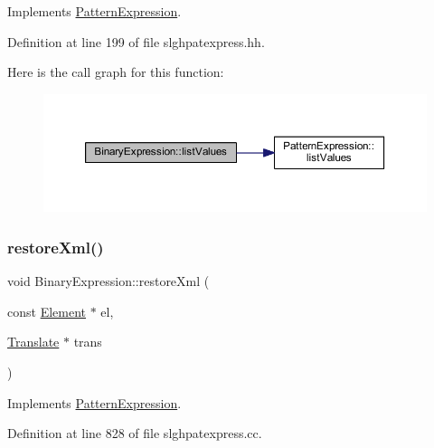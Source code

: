 Implements \mbox{\hyperlink{class_pattern_expression_a48d1a8fce687ba5c272b2e0d72760363}{Pattern\+Expression}}.



Definition at line 199 of file slghpatexpress.\+hh.

Here is the call graph for this function\+:
\nopagebreak
\begin{figure}[H]
\begin{center}
\leavevmode
\includegraphics[width=350pt]{class_binary_expression_ae1a069bae9f98bcb4a4d4f2324e068c8_cgraph}
\end{center}
\end{figure}
\mbox{\label{class_binary_expression_a05e25a311c4f20e01317a707668cf71c}} 
\subsubsection{\texorpdfstring{restoreXml()}{restoreXml()}}
{\footnotesize\ttfamily void Binary\+Expression\+::restore\+Xml (\begin{DoxyParamCaption}\item[{const \mbox{\hyperlink{class_element}{Element}} $\ast$}]{el,  }\item[{\mbox{\hyperlink{class_translate}{Translate}} $\ast$}]{trans }\end{DoxyParamCaption})\hspace{0.3cm}{\ttfamily [virtual]}}



Implements \mbox{\hyperlink{class_pattern_expression_ad8986afdddbe7a8b64fdcf10478b5715}{Pattern\+Expression}}.



Definition at line 828 of file slghpatexpress.\+cc.

